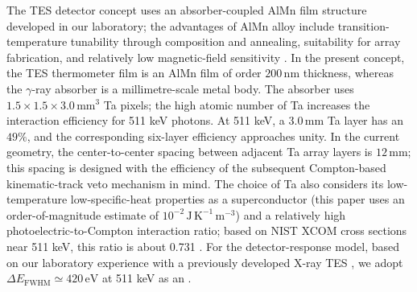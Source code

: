\documentclass[11pt]{article}
\begin{document}
The TES detector concept uses an absorber-coupled AlMn film structure developed in our laboratory; the advantages of AlMn alloy include transition-temperature tunability through composition and annealing, suitability for array fabrication, and relatively low magnetic-field sensitivity \cite{Xie2026AlMn,Vavagiakis2017AlMnMagnetic}. In the present concept, the TES thermometer film is an AlMn film of order $200\,\mathrm{nm}$ thickness, whereas the $\gamma$-ray absorber is a millimetre-scale metal body. The absorber uses $1.5\times1.5\times3.0\,\mathrm{mm^3}$ Ta pixels; the high atomic number of Ta increases the interaction efficiency for 511 keV photons. At 511 keV, a $3.0\,\mathrm{mm}$ Ta layer has an  $49\%$, and the corresponding six-layer efficiency approaches unity. In the current geometry, the center-to-center spacing between adjacent Ta array layers is $12\,\mathrm{mm}$; this spacing is designed with the efficiency of the subsequent Compton-based kinematic-track veto mechanism in mind. The choice of Ta also considers its low-temperature low-specific-heat properties as a superconductor (this paper uses an order-of-magnitude estimate of $10^{-2}\,\mathrm{J\,K^{-1}\,m^{-3}}$) and a relatively high photoelectric-to-Compton interaction ratio; based on NIST XCOM cross sections near 511 keV, this ratio is about 0.731 \cite{NISTXCOM}. For the detector-response model, based on our laboratory experience with a previously developed X-ray TES \cite{Xie2026AlMn}, we adopt $\Delta E_{\mathrm{FWHM}}\simeq420\,\mathrm{eV}$ at 511 keV as an .
\end{document}
